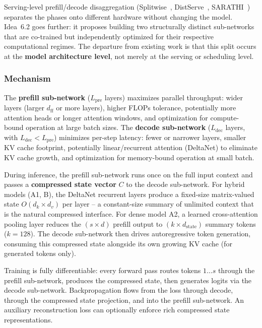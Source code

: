 \documentclass[11pt]{article}
\begin{document}
Serving-level prefill/decode disaggregation (Splitwise~\cite{patel2023splitwise}, DistServe~\cite{zhong2024distserve}, SARATHI~\cite{agrawal2023sarathi}) separates the phases onto different hardware without changing the model. Idea~6.2 goes further: it proposes building two structurally distinct sub-networks that are co-trained but independently optimized for their respective computational regimes. The departure from existing work is that this split occurs at the \textbf{model architecture level}, not merely at the serving or scheduling level.

\subsubsection*{Mechanism}

The \textbf{prefill sub-network} ($L_\text{pre}$ layers) maximizes parallel throughput: wider layers (larger $d_\text{ff}$ or more layers), higher FLOPs tolerance, potentially more attention heads or longer attention windows, and optimization for compute-bound operation at large batch sizes. The \textbf{decode sub-network} ($L_\text{dec}$ layers, with $L_\text{dec} < L_\text{pre}$) minimizes per-step latency: fewer or narrower layers, smaller KV cache footprint, potentially linear/recurrent attention (DeltaNet) to eliminate KV cache growth, and optimization for memory-bound operation at small batch.

During inference, the prefill sub-network runs once on the full input context and passes a \textbf{compressed state vector} $C$ to the decode sub-network. For hybrid models (A1, B), the DeltaNet recurrent layers produce a fixed-size matrix-valued state $O(d_k \times d_v)$ per layer -- a constant-size summary of unlimited context that is the natural compressed interface. For dense model A2, a learned cross-attention pooling layer reduces the $(s \times d)$ prefill output to $(k \times d_\text{state})$ summary tokens ($k = 128$). The decode sub-network then drives autoregressive token generation, consuming this compressed state alongside its own growing KV cache (for generated tokens only).

Training is fully differentiable: every forward pass routes tokens $1 \ldots s$ through the prefill sub-network, produces the compressed state, then generates logits via the decode sub-network. Backpropagation flows from the loss through decode, through the compressed state projection, and into the prefill sub-network. An auxiliary reconstruction loss can optionally enforce rich compressed state representations.
\end{document}
